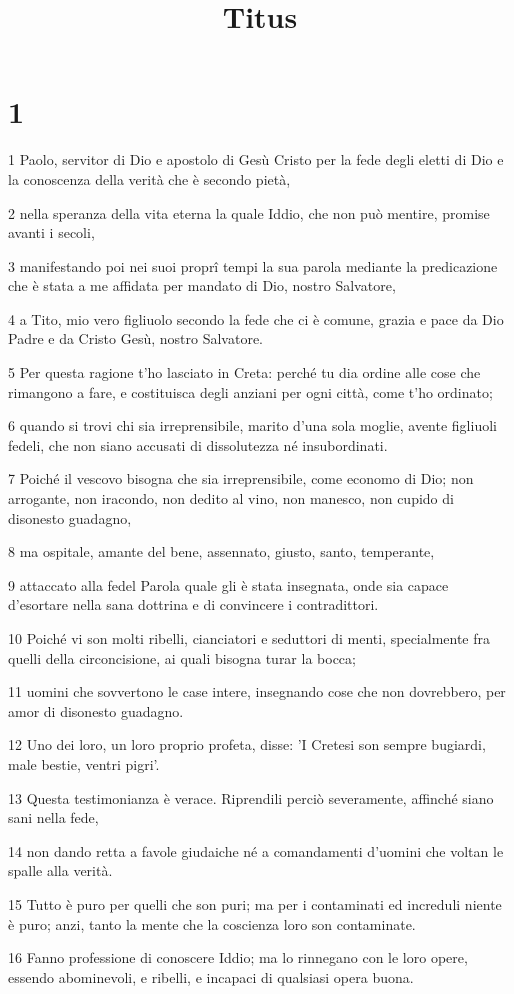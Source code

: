 

\title{Titus}


\chapter{1}

\par 1 Paolo, servitor di Dio e apostolo di Gesù Cristo per la fede degli eletti di Dio e la conoscenza della verità che è secondo pietà,
\par 2 nella speranza della vita eterna la quale Iddio, che non può mentire, promise avanti i secoli,
\par 3 manifestando poi nei suoi proprî tempi la sua parola mediante la predicazione che è stata a me affidata per mandato di Dio, nostro Salvatore,
\par 4 a Tito, mio vero figliuolo secondo la fede che ci è comune, grazia e pace da Dio Padre e da Cristo Gesù, nostro Salvatore.
\par 5 Per questa ragione t'ho lasciato in Creta: perché tu dia ordine alle cose che rimangono a fare, e costituisca degli anziani per ogni città, come t'ho ordinato;
\par 6 quando si trovi chi sia irreprensibile, marito d'una sola moglie, avente figliuoli fedeli, che non siano accusati di dissolutezza né insubordinati.
\par 7 Poiché il vescovo bisogna che sia irreprensibile, come economo di Dio; non arrogante, non iracondo, non dedito al vino, non manesco, non cupido di disonesto guadagno,
\par 8 ma ospitale, amante del bene, assennato, giusto, santo, temperante,
\par 9 attaccato alla fedel Parola quale gli è stata insegnata, onde sia capace d'esortare nella sana dottrina e di convincere i contradittori.
\par 10 Poiché vi son molti ribelli, cianciatori e seduttori di menti, specialmente fra quelli della circoncisione, ai quali bisogna turar la bocca;
\par 11 uomini che sovvertono le case intere, insegnando cose che non dovrebbero, per amor di disonesto guadagno.
\par 12 Uno dei loro, un loro proprio profeta, disse: 'I Cretesi son sempre bugiardi, male bestie, ventri pigri'.
\par 13 Questa testimonianza è verace. Riprendili perciò severamente, affinché siano sani nella fede,
\par 14 non dando retta a favole giudaiche né a comandamenti d'uomini che voltan le spalle alla verità.
\par 15 Tutto è puro per quelli che son puri; ma per i contaminati ed increduli niente è puro; anzi, tanto la mente che la coscienza loro son contaminate.
\par 16 Fanno professione di conoscere Iddio; ma lo rinnegano con le loro opere, essendo abominevoli, e ribelli, e incapaci di qualsiasi opera buona.

